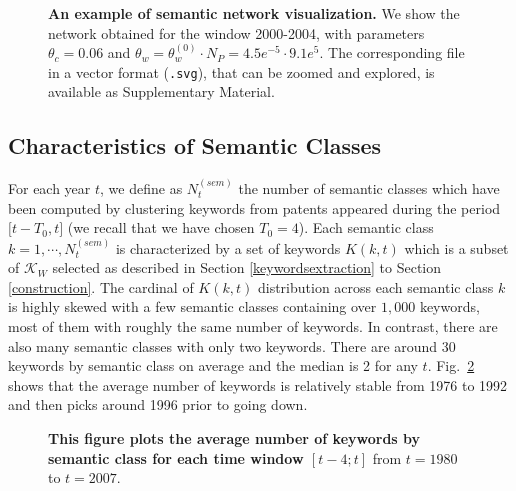 \documentclass[10pt,A4,draft]{article}
\begin{document}
\begin{figure}
\centering
\caption{\textbf{An example of semantic network visualization.} We show the network obtained for the window 2000-2004, with parameters $\theta_c = 0.06$ and $\theta_w = \theta_w^{(0)}\cdot N_P = 4.5e^{-5} \cdot 9.1e^{5}$. The corresponding file in a vector format (\texttt{.svg}), that can be zoomed and explored, is available as Supplementary Material.}
\label{fig:rawnetwork}
\end{figure}



\subsection{Characteristics of Semantic Classes}
\label{characteristics}
For each year $t$, we define as $N^{(sem)}_t$ the number of semantic classes which have been computed by clustering keywords from patents appeared during the period $\big[ t-T_0, t \big]$ (we recall that we have chosen $T_0=4$). Each semantic class $k =  1, \cdots, N^{(sem)}_t$ is characterized by a set of keywords $K(k,t)$ which is a subset of $\mathcal{K}_W$ selected as described in Section \ref{keywordsextraction} to Section \ref{construction}. The cardinal of $K(k, t)$ distribution across each semantic class $k$ is highly skewed with a few semantic classes containing over $1,000$ keywords, most of them with roughly the same number of keywords. In contrast, there are also many semantic classes with only two keywords. There are around 30 keywords by semantic class on average and the median is 2 for any $t$. Fig.~\ref{fig:mean_K} shows that the average number of keywords is relatively stable from 1976 to 1992 and then picks around 1996 prior to going down.



\begin{figure}
\centering
\caption{\textbf{This figure plots the average number of keywords by semantic class for each time window $\left[t-4; t\right]$} from $t=1980$ to $t=2007$.}
\label{fig:mean_K}
\end{figure}
\end{document}
